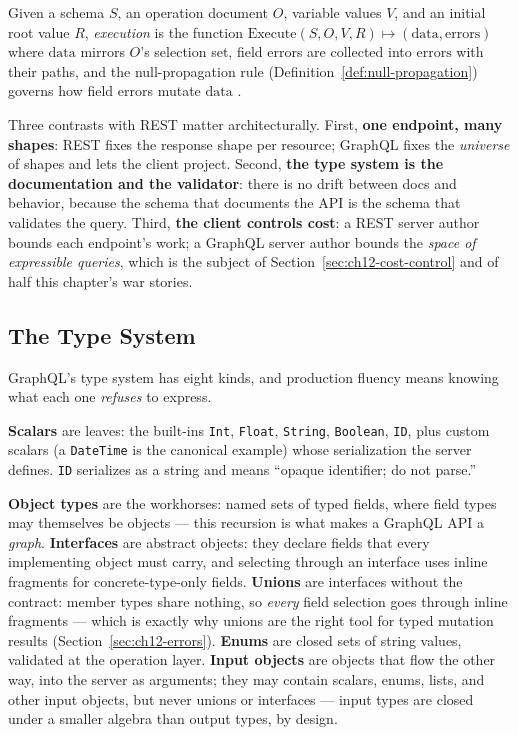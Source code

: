 \begin{definition}
Given a schema $S$, an operation document $O$, variable values $V$, and an
initial root value $R$, \emph{execution} is the function
$\mathrm{Execute}(S, O, V, R) \mapsto (\mathrm{data}, \mathrm{errors})$
where $\mathrm{data}$ mirrors $O$'s selection set, field errors are
collected into $\mathrm{errors}$ with their paths, and the null-propagation
rule (Definition~\ref{def:null-propagation}) governs how field errors
mutate $\mathrm{data}$ \cite{graphqlspec}.
\end{definition}

Three contrasts with REST matter architecturally. First, \textbf{one
endpoint, many shapes}: REST fixes the response shape per resource; GraphQL
fixes the \emph{universe} of shapes and lets the client project. Second,
\textbf{the type system is the documentation and the validator}: there is
no drift between docs and behavior, because the schema that documents the
API is the schema that validates the query. Third, \textbf{the client
controls cost}: a REST server author bounds each endpoint's work; a
GraphQL server author bounds the \emph{space of expressible queries}, which
is the subject of Section~\ref{sec:ch12-cost-control} and of half this
chapter's war stories.

\subsection{The Type System}
\label{sec:ch12-type-system}

GraphQL's type system has eight kinds, and production fluency means knowing
what each one \emph{refuses} to express.

\textbf{Scalars} are leaves: the built-ins \texttt{Int}, \texttt{Float},
\texttt{String}, \texttt{Boolean}, \texttt{ID}, plus custom scalars (a
\texttt{DateTime} is the canonical example) whose serialization the server
defines. \texttt{ID} serializes as a string and means ``opaque identifier;
do not parse.''

\textbf{Object types} are the workhorses: named sets of typed fields,
where field types may themselves be objects --- this recursion is what
makes a GraphQL API a \emph{graph}. \textbf{Interfaces} are abstract
objects: they declare fields that every implementing object must carry,
and selecting through an interface uses inline fragments for
concrete-type-only fields. \textbf{Unions} are interfaces without the
contract: member types share nothing, so \emph{every} field selection goes
through inline fragments --- which is exactly why unions are the right
tool for typed mutation results (Section~\ref{sec:ch12-errors}).
\textbf{Enums} are closed sets of string values, validated at the
operation layer. \textbf{Input objects} are objects that flow the other
way, into the server as arguments; they may contain scalars, enums, lists,
and other input objects, but never unions or interfaces --- input types
are closed under a smaller algebra than output types, by design.

